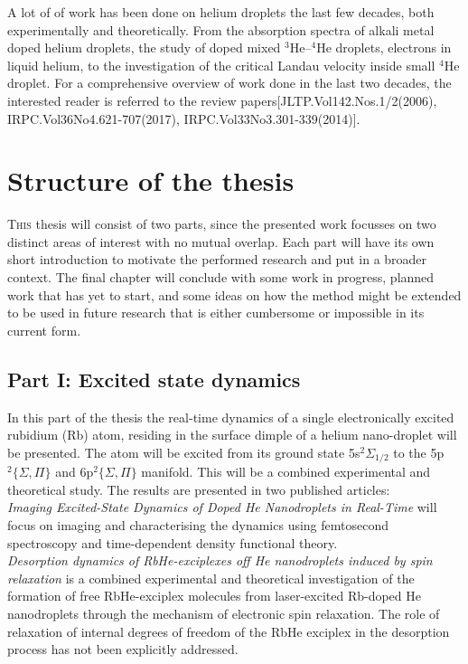 		A lot of of work has been done on helium droplets the last few decades, both experimentally and theoretically. From the absorption spectra of alkali metal doped helium droplets, the study of doped mixed $^3$He--$^4$He droplets, electrons in liquid helium, to the investigation of the critical Landau velocity inside small $^4$He droplet. For a comprehensive overview of work done in the last two decades, the interested reader is referred to the review papers[JLTP.Vol142.Nos.1/2(2006), IRPC.Vol36No4.621-707(2017), IRPC.Vol33No3.301-339(2014)].

	\section{Structure of the thesis}
		\lettrine[lines=3,findent=3pt,nindent=0pt]{T}{his} thesis will consist of two parts, since the presented work focusses on two distinct areas of interest with no mutual overlap. Each part will have its own short introduction to motivate the performed research and put in a broader context. The final chapter will conclude with some work in progress, planned work that has yet to start, and some ideas on how the method might be extended to be used in future research that is either cumbersome or impossible in its current form.

		\subsection{Part I: Excited state dynamics}
			In this part of the thesis the real-time dynamics of a single electronically excited rubidium (Rb) atom, residing in the surface dimple of a helium nano-droplet will be presented. The atom will be excited from its ground state 5s$^2\Sigma_{1/2}$ to the 5p$^2\{\Sigma,\Pi\}$ and 6p$^2\{\Sigma,\Pi\}$ manifold. This will be a combined experimental and theoretical study. The results are presented in two published articles:\\
		
			\emph{Imaging Excited-State Dynamics of Doped He Nanodroplets in Real-Time} will focus on imaging and characterising the dynamics using femtosecond spectroscopy and  time-dependent density functional theory.\\
		
			\emph{Desorption dynamics of RbHe-exciplexes off He nanodroplets induced by spin relaxation} is a combined experimental and theoretical investigation of the formation of free RbHe-exciplex molecules from laser-excited Rb-doped He nanodroplets through the mechanism of electronic spin relaxation. The role of relaxation of internal degrees of freedom of the RbHe exciplex in the desorption process has not been explicitly addressed.

